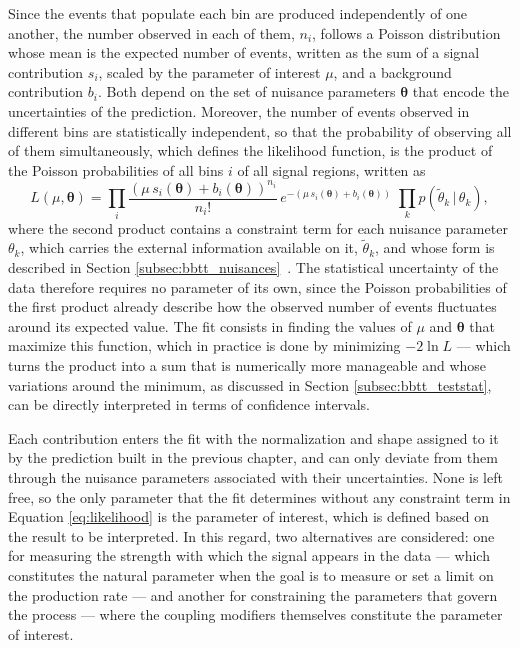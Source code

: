 Since the events that populate each bin are produced independently of one another, the number observed in each of them, $n_i$, follows a Poisson distribution whose mean is the expected number of events, written as the sum of a signal contribution $s_i$, scaled by the parameter of interest $\mu$, and a background contribution $b_i$. Both depend on the set of nuisance parameters $\boldsymbol{\theta}$ that encode the uncertainties of the prediction. Moreover, the number of events observed in different bins are statistically independent, so that the probability of observing all of them simultaneously, which defines the likelihood function, is the product of the Poisson probabilities of all bins $i$ of all signal regions, written as
\begin{equation}
    L(\mu,\boldsymbol{\theta}) = \prod_{i} \frac{\left(\mu\, s_i(\boldsymbol{\theta}) + b_i(\boldsymbol{\theta})\right)^{n_i}}{n_i!}\, e^{-\left(\mu\, s_i(\boldsymbol{\theta}) + b_i(\boldsymbol{\theta})\right)} \;\prod_{k} p(\tilde{\theta}_k\,|\,\theta_k),
    \label{eq:likelihood}
\end{equation}
where the second product contains a constraint term for each nuisance parameter $\theta_k$, which carries the external information available on it, $\tilde{\theta}_k$, and whose form is described in Section \ref{subsec:bbtt_nuisances}~\cite{CMS-combine}. The statistical uncertainty of the data therefore requires no parameter of its own, since the Poisson probabilities of the first product already describe how the observed number of events fluctuates around its expected value. The fit consists in finding the values of $\mu$ and $\boldsymbol{\theta}$ that maximize this function, which in practice is done by minimizing $-2\ln L$ — which turns the product into a sum that is numerically more manageable and whose variations around the minimum, as discussed in Section \ref{subsec:bbtt_teststat}, can be directly interpreted in terms of confidence intervals.


Each contribution enters the fit with the normalization and shape assigned to it by the prediction built in the previous chapter, and can only deviate from them through the nuisance parameters associated with their uncertainties. None is left free, so the only parameter that the fit determines without any constraint term in Equation \ref{eq:likelihood} is the parameter of interest, which is defined based on the result to be interpreted. In this regard, two alternatives are considered: one for measuring the strength with which the signal appears in the data — which constitutes the natural parameter when the goal is to measure or set a limit on the production rate — and another for constraining the parameters that govern the process — where the coupling modifiers themselves constitute the parameter of interest.\medskip


